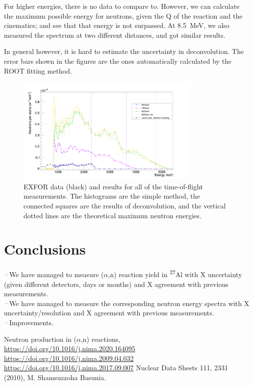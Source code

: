 \documentclass[a4paper,12pt]{report}
\newcommand{\an}{($\alpha$,n) }
\newcommand{\Aliso}{\textsuperscript{27}Al }
\begin{document}
For higher energies, there is no data to compare to.
However, we can calculate the maximum possible energy for neutrons, given the Q of the reaction and the cinematics; and see that that energy is not surpassed.
At \qty{8.5}{\MeV}, we also measured the spectrum at two different distances, and got similar results.

In general however, it is hard to estimate the uncertainty in deconvolution.
The error bars shown in the figures are the ones automatically calculated by the ROOT fitting method.

\begin{figure}[H]
	\centering
	\includegraphics[width=0.80\textwidth]{pulsed_results.png}
	\caption{EXFOR data (black) and results for all of the time-of-flight measurements.
	The histograms are the simple method, the connected squares are the results of deconvolution, and the vertical dotted lines are the theoretical maximum neutron energies.}
	\label{pulsed_results}
\end{figure}

\chapter{Conclusions}
·We have managed to measure \an reaction yield in \Aliso with X uncertainty (given different detectors, days or months) and X agreement with previous measurements.\\
·We have managed to measure the corresponding neutron energy spectra with X uncertainty/resolution and X agreement with previous measurements.\\
·Improvements.\\

\begin{thebibliography}{5}
	Neutron production in \an reactions, \url{https://doi.org/10.1016/j.nima.2020.164095}
	\bibitem{}\url{https://doi.org/10.1016/j.nima.2009.04.032}
	\bibitem{}\url{https://doi.org/10.1016/j.nima.2017.09.007}
	Nuclear Data Sheets 111, 2331 (2010), M. Shamsuzzoha Basunia.
\end{thebibliography}
\end{document}
